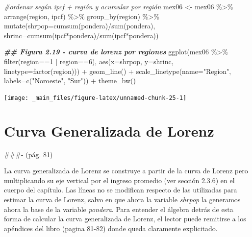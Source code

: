 \documentclass[
]{book}
\newenvironment{Shaded}{\begin{snugshade}}{\end{snugshade}}
\newcommand{\AttributeTok}[1]{\textcolor[rgb]{0.77,0.63,0.00}{#1}}
\newcommand{\CommentTok}[1]{\textcolor[rgb]{0.56,0.35,0.01}{\textit{#1}}}
\newcommand{\DecValTok}[1]{\textcolor[rgb]{0.00,0.00,0.81}{#1}}
\newcommand{\DocumentationTok}[1]{\textcolor[rgb]{0.56,0.35,0.01}{\textbf{\textit{#1}}}}
\newcommand{\FunctionTok}[1]{\textcolor[rgb]{0.00,0.00,0.00}{#1}}
\newcommand{\NormalTok}[1]{#1}
\newcommand{\OtherTok}[1]{\textcolor[rgb]{0.56,0.35,0.01}{#1}}
\newcommand{\SpecialCharTok}[1]{\textcolor[rgb]{0.00,0.00,0.00}{#1}}
\newcommand{\StringTok}[1]{\textcolor[rgb]{0.31,0.60,0.02}{#1}}
\begin{document}
\begin{Shaded}
\begin{Highlighting}[]
\CommentTok{\#ordenar según ipcf + región y acumular por región}
\NormalTok{mex06 }\OtherTok{\textless{}{-}}\NormalTok{ mex06 }\SpecialCharTok{\%\textgreater{}\%} \FunctionTok{arrange}\NormalTok{(region, ipcf) }\SpecialCharTok{\%\textgreater{}\%} 
                   \FunctionTok{group\_by}\NormalTok{(region) }\SpecialCharTok{\%\textgreater{}\%} 
                   \FunctionTok{mutate}\NormalTok{(}\AttributeTok{shrpop=}\FunctionTok{cumsum}\NormalTok{(pondera)}\SpecialCharTok{/}\FunctionTok{sum}\NormalTok{(pondera),}
                          \AttributeTok{shrinc=}\FunctionTok{cumsum}\NormalTok{(ipcf}\SpecialCharTok{*}\NormalTok{pondera)}\SpecialCharTok{/}\FunctionTok{sum}\NormalTok{(ipcf}\SpecialCharTok{*}\NormalTok{pondera)) }

\DocumentationTok{\#\# Figura 2.19 {-} curva de lorenz por regiones}
\FunctionTok{ggplot}\NormalTok{(mex06 }\SpecialCharTok{\%\textgreater{}\%} \FunctionTok{filter}\NormalTok{(region}\SpecialCharTok{==}\DecValTok{1} \SpecialCharTok{|}\NormalTok{ region}\SpecialCharTok{==}\DecValTok{6}\NormalTok{),}
       \FunctionTok{aes}\NormalTok{(}\AttributeTok{x=}\NormalTok{shrpop, }\AttributeTok{y=}\NormalTok{shrinc, }\AttributeTok{linetype=}\FunctionTok{factor}\NormalTok{(region))) }\SpecialCharTok{+}
  \FunctionTok{geom\_line}\NormalTok{() }\SpecialCharTok{+}
  \FunctionTok{scale\_linetype}\NormalTok{(}\AttributeTok{name=}\StringTok{"Region"}\NormalTok{, }\AttributeTok{labels=}\FunctionTok{c}\NormalTok{(}\StringTok{"Noroeste"}\NormalTok{, }\StringTok{"Sur"}\NormalTok{)) }\SpecialCharTok{+}
  \FunctionTok{theme\_bw}\NormalTok{()}
\end{Highlighting}
\end{Shaded}

\texttt{[image: \_main\_files/figure-latex/unnamed-chunk-25-1]}

\hypertarget{curva-generalizada-de-lorenz}{%
\section{Curva Generalizada de Lorenz}\label{curva-generalizada-de-lorenz}}

\#\#\#- (pág. 81)

La curva generalizada de Lorenz se construye a partir de la curva de Lorenz pero multiplicando su eje vertical por el ingreso promedio (ver sección 2.3.6) en el cuerpo del capítulo. Las líneas no se modifican respecto de las utilizadas para estimar la curva de Lorenz, salvo en que ahora la variable \emph{shrpop} la generamos ahora la base de la variable \emph{pondera}. Para entender el álgebra detrás de esta forma de calcular la curva generalizada de Lorenz, el lector puede remitirse a los apéndices del libro (pagina 81-82) donde queda claramente explicitado.
\end{document}
